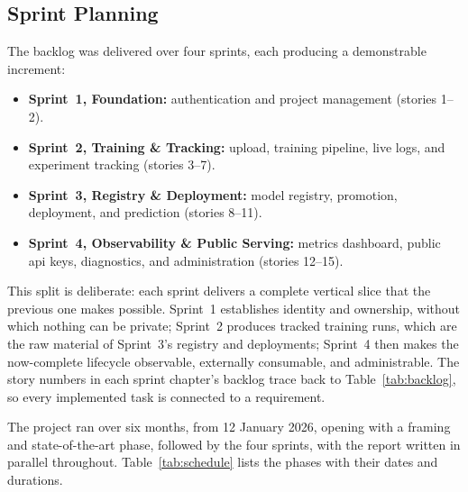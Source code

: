 \subsection{Sprint Planning}
\label{sec:release-plan}
The backlog was delivered over four sprints, each producing a demonstrable
increment:

\begin{itemize}[leftmargin=1.4em]
  \item \textbf{Sprint~1, Foundation:} authentication and project management
        (stories 1--2).
  \item \textbf{Sprint~2, Training \& Tracking:} upload, training pipeline, live
        logs, and experiment tracking (stories 3--7).
  \item \textbf{Sprint~3, Registry \& Deployment:} model registry, promotion,
        deployment, and prediction (stories 8--11).
  \item \textbf{Sprint~4, Observability \& Public Serving:} metrics dashboard,
        public \gls{api} keys, diagnostics, and administration (stories 12--15).
\end{itemize}

This split is deliberate: each sprint delivers a complete vertical slice that the
previous one makes possible. Sprint~1 establishes identity and ownership, without
which nothing can be private; Sprint~2 produces tracked training runs, which are
the raw material of Sprint~3's registry and deployments; Sprint~4 then makes the
now-complete lifecycle observable, externally consumable, and administrable. The
story numbers in each sprint chapter's backlog trace back to
Table~\ref{tab:backlog}, so every implemented task is connected to a requirement.

The project ran over six months, from 12 January 2026, opening with a framing and
state-of-the-art phase, followed by the four sprints, with the report written in
parallel throughout. Table~\ref{tab:schedule} lists the phases with their dates and
durations.

